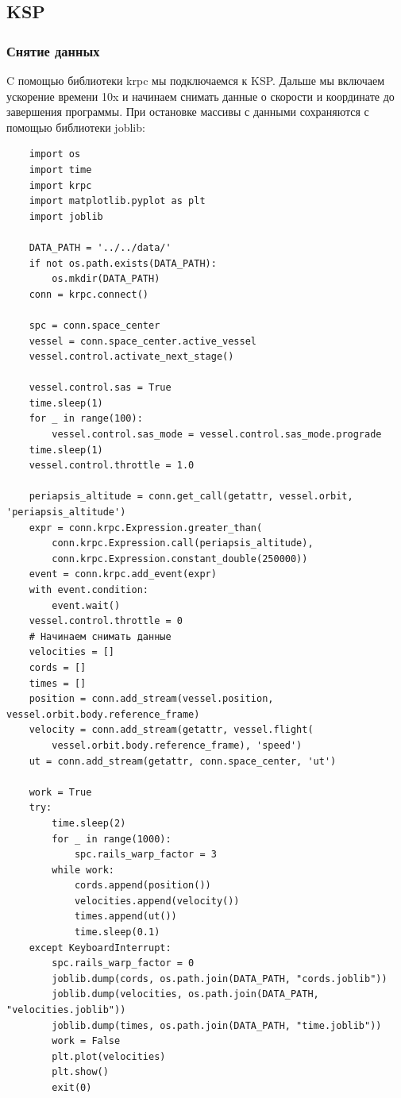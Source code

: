 \documentclass{article}
\begin{document}
    \subsection{KSP}
    \subsubsection{Снятие данных}
     C помощью библиотеки krpc мы подключаемся к KSP. Дальше мы включаем ускорение времени 10x и начинаем снимать данные о скорости и координате до завершения программы. При остановке массивы с данными сохраняются с помощью библиотеки joblib:
     \begin{verbatim}
    import os
    import time
    import krpc
    import matplotlib.pyplot as plt
    import joblib
    
    DATA_PATH = '../../data/'
    if not os.path.exists(DATA_PATH):
        os.mkdir(DATA_PATH)
    conn = krpc.connect()
    
    spc = conn.space_center
    vessel = conn.space_center.active_vessel
    vessel.control.activate_next_stage()
    
    vessel.control.sas = True
    time.sleep(1)
    for _ in range(100):
        vessel.control.sas_mode = vessel.control.sas_mode.prograde
    time.sleep(1)
    vessel.control.throttle = 1.0
    
    periapsis_altitude = conn.get_call(getattr, vessel.orbit, 'periapsis_altitude')
    expr = conn.krpc.Expression.greater_than(
        conn.krpc.Expression.call(periapsis_altitude),
        conn.krpc.Expression.constant_double(250000))
    event = conn.krpc.add_event(expr)
    with event.condition:
        event.wait()
    vessel.control.throttle = 0
    # Начинаем снимать данные
    velocities = []
    cords = []
    times = []
    position = conn.add_stream(vessel.position, vessel.orbit.body.reference_frame)
    velocity = conn.add_stream(getattr, vessel.flight(
        vessel.orbit.body.reference_frame), 'speed')
    ut = conn.add_stream(getattr, conn.space_center, 'ut')
    
    work = True
    try:
        time.sleep(2)
        for _ in range(1000):
            spc.rails_warp_factor = 3
        while work:
            cords.append(position())
            velocities.append(velocity())
            times.append(ut())
            time.sleep(0.1)
    except KeyboardInterrupt:
        spc.rails_warp_factor = 0
        joblib.dump(cords, os.path.join(DATA_PATH, "cords.joblib"))
        joblib.dump(velocities, os.path.join(DATA_PATH, "velocities.joblib"))
        joblib.dump(times, os.path.join(DATA_PATH, "time.joblib"))
        work = False
        plt.plot(velocities)
        plt.show()
        exit(0)

     \end{verbatim}
\end{document}
